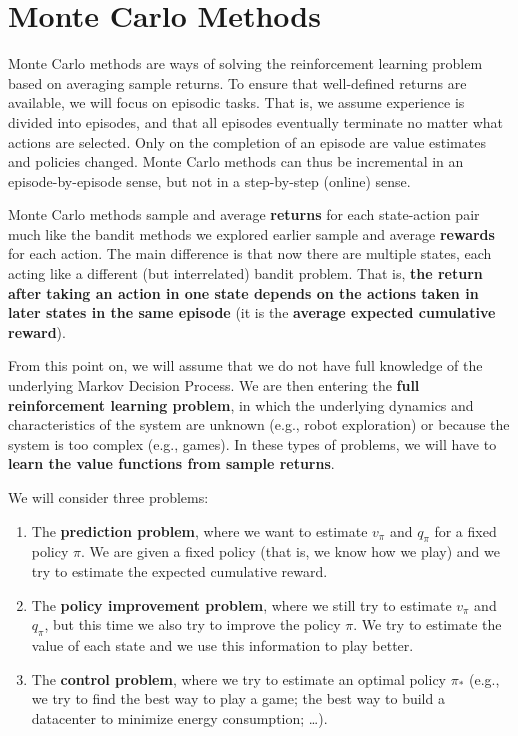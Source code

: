 \chapter{Monte Carlo Methods}
Monte Carlo methods are ways of solving the reinforcement learning problem based on averaging sample returns. To ensure that well-defined returns are available, we will focus on episodic tasks. That is, we assume experience is divided into episodes, and that all episodes eventually terminate no matter what actions are selected. Only on the completion of an episode are value estimates and policies changed. Monte Carlo methods can thus be incremental in an episode-by-episode sense, but not in a step-by-step (online) sense.

Monte Carlo methods sample and average \textbf{returns} for each state-action pair much like the bandit methods we explored earlier sample and average \textbf{rewards} for each action. The main difference is that now there are multiple states, each acting like a different (but interrelated) bandit problem. That is, \textbf{the return after taking an action in one state depends on the actions taken in later states in the same episode} (it is the \textbf{average expected cumulative reward}). 

From this point on, we will assume that we do not have full knowledge of the underlying Markov Decision Process. We are then entering the \textbf{full reinforcement learning problem}, in which the underlying dynamics and characteristics of the system are unknown (e.g., robot exploration) or because the system is too complex (e.g., games). In these types of problems, we will have to \textbf{learn the value functions from sample returns}.

We will consider three problems:
\begin{enumerate}
    \item The \textbf{prediction problem}, where we want to estimate $v_\pi$ and $q_\pi$ for a fixed policy $\pi$. We are given a fixed policy (that is, we know how we play) and we try to estimate the expected cumulative reward.
    \item The \textbf{policy improvement problem}, where we still try to estimate $v_\pi$ and $q_\pi$, but this time we also try to improve the policy $\pi$. We try to estimate the value of each state and we use this information to play better.
    \item The \textbf{control problem}, where we try to estimate an optimal policy $\pi_*$ (e.g., we try to find the best way to play a game; the best way to build a datacenter to minimize energy consumption; …).
\end{enumerate}

